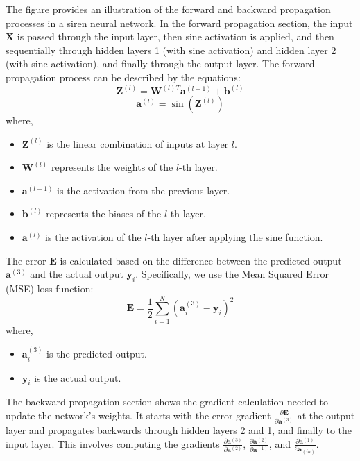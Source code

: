 \documentclass{ioereport}
\begin{document}
The figure provides an illustration of the forward and backward propagation processes in a \gls{siren} neural network. In the forward propagation section, the input \( \mathbf{X} \) is passed through the input layer, then sine activation is applied, and then sequentially through hidden layers 1 (with sine activation) and hidden layer 2 (with sine activation), and finally through the output layer. The forward propagation process can be described by the equations:
\begin{equation}
    \mathbf{Z}^{(l)} = \mathbf{W}^{(l)T} \mathbf{a}^{(l-1)} + \mathbf{b}^{(l)}
\end{equation}
\begin{equation}
    \mathbf{a}^{(l)} = \sin(\mathbf{Z}^{(l)})
\end{equation}
where,
\begin{itemize}
    \item \( \mathbf{Z}^{(l)} \) is the linear combination of inputs at layer \( l \).
    \item \( \mathbf{W}^{(l)} \) represents the weights of the \( l \)-th layer.
    \item \( \mathbf{a}^{(l-1)} \) is the activation from the previous layer.
    \item \( \mathbf{b}^{(l)} \) represents the biases of the \( l \)-th layer.
    \item \( \mathbf{a}^{(l)} \) is the activation of the \( l \)-th layer after applying the sine function.
\end{itemize}

The error \( \mathbf{E} \) is calculated based on the difference between the predicted output \( \mathbf{a}^{(3)} \) and the actual output \( \mathbf{y}_i \). Specifically, we use the Mean Squared Error (MSE) loss function:
\begin{equation}
    \mathbf{E} = \frac{1}{2} \sum_{i=1}^{N} (\mathbf{a}^{(3)}_i - \mathbf{y}_i)^2
\end{equation}
where,
\begin{itemize}
    \item \( \mathbf{a}^{(3)}_i \) is the predicted output.
    \item \( \mathbf{y}_i \) is the actual output.
\end{itemize}

The backward propagation section shows the gradient calculation needed to update the network's weights. It starts with the error gradient \( \frac{\partial \mathbf{E}}{\partial \mathbf{a}^{(3)}} \) at the output layer and propagates backwards through hidden layers 2 and 1, and finally to the input layer. This involves computing the gradients \( \frac{\partial \mathbf{a}^{(3)}}{\partial \mathbf{a}^{(2)}} \), \( \frac{\partial \mathbf{a}^{(2)}}{\partial \mathbf{a}^{(1)}} \), and \( \frac{\partial \mathbf{a}^{(1)}}{\partial \mathbf{a}_{(in)}} \).
\end{document}
